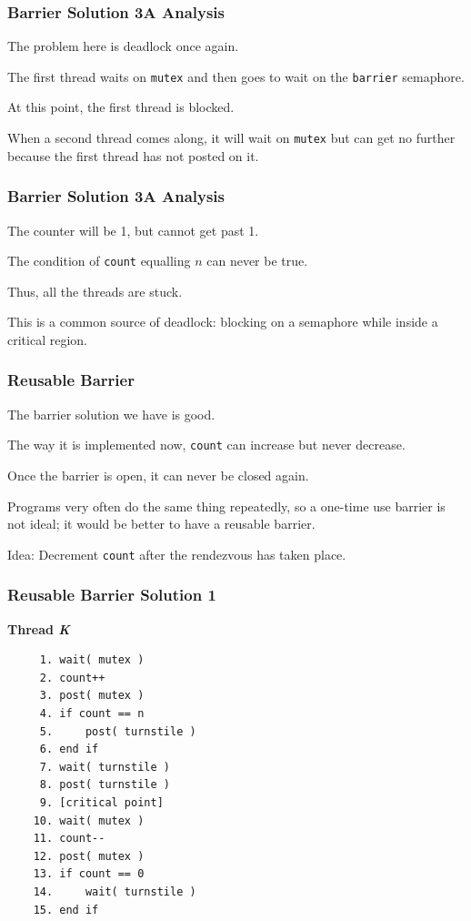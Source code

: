 \begin{frame}
	\frametitle{Barrier Solution 3A Analysis}

	The problem here is deadlock once again.

	The first thread waits on \texttt{mutex} and then goes to wait on the \texttt{barrier} semaphore.

	At this point, the first thread is blocked.

	When a second thread comes along, it will wait on \texttt{mutex} but can get no further because the first thread has not posted on it.


\end{frame}

\begin{frame}
	\frametitle{Barrier Solution 3A Analysis}

	The counter will be 1, but cannot get past 1.

	The condition of \texttt{count} equalling $n$ can never be true.

	Thus, all the threads are stuck.

	This is a common source of deadlock: blocking on a semaphore while inside a critical region.

\end{frame}

\begin{frame}
	\frametitle{Reusable Barrier}

	The barrier solution we have is good.

	The way it is implemented now, \texttt{count} can increase but never decrease.

	Once the barrier is open, it can never be closed again.

	Programs very often do the same thing repeatedly, so a one-time use barrier is not ideal; it would be better to have a reusable barrier.

	Idea: Decrement \texttt{count} after the rendezvous has taken place.

\end{frame}

\begin{frame}[fragile]
	\frametitle{Reusable Barrier Solution 1}

	\textbf{Thread \textit{K}}\vspace{-2em}
	\begin{verbatim}
	 1. wait( mutex )
	 2. count++
	 3. post( mutex )
	 4. if count == n
	 5.     post( turnstile )
	 6. end if
	 7. wait( turnstile )
	 8. post( turnstile )
	 9. [critical point]
	10. wait( mutex )
	11. count--
	12. post( mutex )
	13. if count == 0
	14.     wait( turnstile )
	15. end if
  \end{verbatim}
	\vspace{-2em}

\end{frame}

